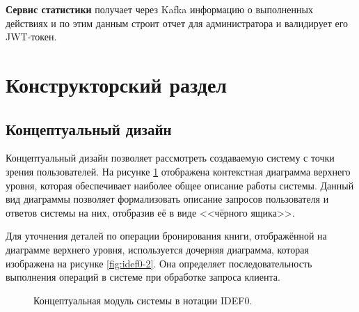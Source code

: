 \documentclass[a4paper, 12pt]{article}
\begin{document}
\begin{large}
\textbf{Сервис статистики} получает через Kafka информацию о выполненных действиях и по этим данным строит отчет для администратора и валидирует его JWT-токен.

\newpage

\section{Конструкторский раздел}
\subsection{Концептуальный дизайн}
Концептуальный дизайн позволяет рассмотреть создаваемую систему с точки зрения пользователей. 
На рисунке \ref{fig:idef0-1} отображена контекстная диаграмма верхнего уровня, которая обеспечивает наиболее общее описание работы системы. 
Данный вид диаграммы позволяет формализовать описание запросов пользователя и ответов системы на них, отобразив её в виде <<чёрного ящика>>.

Для уточнения деталей по операции бронирования книги, отображённой на диаграмме верхнего уровня, используется дочерняя диаграмма, которая изображена на рисунке \ref{fig:idef0-2}. 
Она определяет последовательность выполнения операций в системе при обработке запроса клиента. 

\newpage
\begin{landscape}
	\begin{figure}[h!]
		\caption{Концептуальная модуль системы в нотации IDEF0.}
		\label{fig:idef0-1}
	\end{figure}


\end{landscape}
\end{large}
\end{document}
